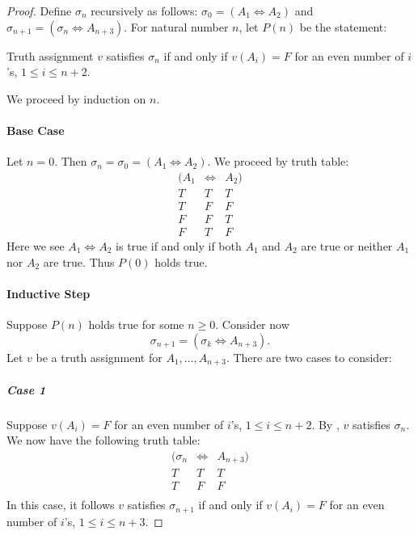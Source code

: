 \documentclass{report}
\begin{document}
  \begin{proof}

    Define $\sigma_n$ recursively as follows:
      $\sigma_0 = (A_1 \Leftrightarrow A_2)$ and
      $\sigma_{n+1} = (\sigma_n \Leftrightarrow A_{n+3})$.
    For natural number $n$, let $P(n)$ be the statement:
      \begin{induction}
        Truth assignment $v$ satisfies $\sigma_n$ if and only if $v(A_i) = F$
          for an even number of $i$'s, $1 \leq i \leq n + 2$.
      \end{induction}
    \noindent
    We proceed by induction on $n$.

    \paragraph{Base Case}%

      Let $n = 0$.
      Then $\sigma_n = \sigma_0 = (A_1 \Leftrightarrow A_2)$.
      We proceed by truth table:
        $$\begin{array}{s|e|s}
          (A_1 & \Leftrightarrow & A_2) \\
          \hline
          T & T & T \\
          T & F & F \\
          F & F & T \\
          F & T & F
        \end{array}$$
      Here we see $A_1 \Leftrightarrow A_2$ is true if and only if both $A_1$
        and $A_2$ are true or neither $A_1$ nor $A_2$ are true.
      Thus $P(0)$ holds true.

    \paragraph{Inductive Step}%

      Suppose $P(n)$ holds true for some $n \geq 0$.
      Consider now $$\sigma_{n+1} = (\sigma_k \Leftrightarrow A_{n+3}).$$
      Let $v$ be a truth assignment for $A_1, \ldots, A_{n+3}$.
      There are two cases to consider:

      \subparagraph{Case 1}%

        Suppose $v(A_i) = F$ for an even number of $i$'s, $1 \leq i \leq n + 2$.
        By , $v$ satisfies $\sigma_n$.
        We now have the following truth table:
          $$\begin{array}{s|e|s}
            (\sigma_n & \Leftrightarrow & A_{n+3}) \\
            \hline
            T & T & T \\
            T & F & F \\
          \end{array}$$
        In this case, it follows $v$ satisfies $\sigma_{n+1}$ if and only if
          $v(A_i) = F$ for an even number of $i$'s, $1 \leq i \leq n + 3$.


\end{proof}
\end{document}

